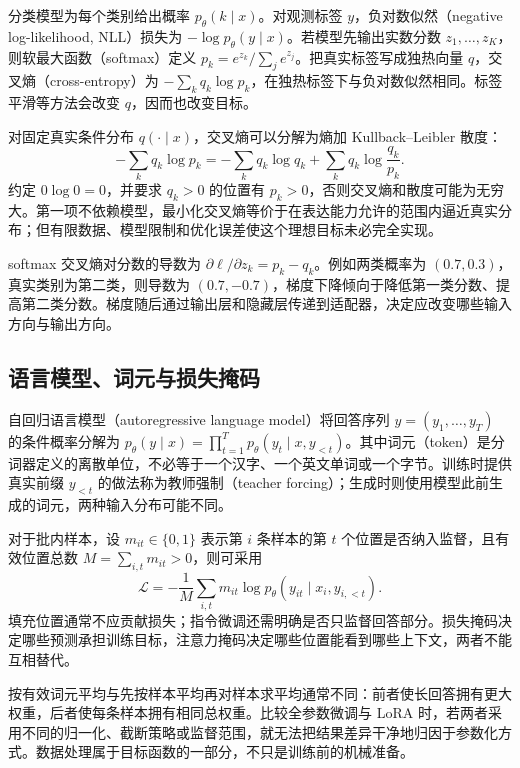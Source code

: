 \documentclass[UTF8,12pt,a4paper,fontset=fandol]{ctexart}
\begin{document}
分类模型为每个类别给出概率 $p_\theta(k\mid x)$。对观测标签 $y$，负对数似然（negative log-likelihood, NLL）损失为
$-\log p_\theta(y\mid x)$。若模型先输出实数分数 $z_1,\ldots,z_K$，则软最大函数（softmax）定义
$p_k=e^{z_k}/\sum_je^{z_j}$。把真实标签写成独热向量 $q$，交叉熵（cross-entropy）为
$-\sum_kq_k\log p_k$，在独热标签下与负对数似然相同。标签平滑等方法会改变 $q$，因而也改变目标。

对固定真实条件分布 $q(\cdot\mid x)$，交叉熵可以分解为熵加 Kullback--Leibler 散度：
\[
-\sum_kq_k\log p_k
=-\sum_kq_k\log q_k+\sum_kq_k\log\frac{q_k}{p_k}.
\]
约定 $0\log0=0$，并要求 $q_k>0$ 的位置有 $p_k>0$，否则交叉熵和散度可能为无穷大。第一项不依赖模型，最小化交叉熵等价于在表达能力允许的范围内逼近真实分布；但有限数据、模型限制和优化误差使这个理想目标未必完全实现。

softmax 交叉熵对分数的导数为 $\partial\ell/\partial z_k=p_k-q_k$。例如两类概率为 $(0.7,0.3)$，真实类别为第二类，则导数为 $(0.7,-0.7)$，梯度下降倾向于降低第一类分数、提高第二类分数。梯度随后通过输出层和隐藏层传递到适配器，决定应改变哪些输入方向与输出方向。

\subsection{语言模型、词元与损失掩码}

自回归语言模型（autoregressive language model）将回答序列 $y=(y_1,\ldots,y_T)$ 的条件概率分解为
$p_\theta(y\mid x)=\prod_{t=1}^{T}p_\theta(y_t\mid x,y_{<t})$。其中词元（token）是分词器定义的离散单位，不必等于一个汉字、一个英文单词或一个字节。训练时提供真实前缀 $y_{<t}$ 的做法称为教师强制（teacher forcing）；生成时则使用模型此前生成的词元，两种输入分布可能不同。

对于批内样本，设 $m_{it}\in\{0,1\}$ 表示第 $i$ 条样本的第 $t$ 个位置是否纳入监督，且有效位置总数 $M=\sum_{i,t}m_{it}>0$，则可采用
\begin{equation}
\mathcal L=-\frac1M\sum_{i,t}m_{it}
\log p_\theta(y_{it}\mid x_i,y_{i,<t}).
\label{eq:token-loss}
\end{equation}
填充位置通常不应贡献损失；指令微调还需明确是否只监督回答部分。损失掩码决定哪些预测承担训练目标，注意力掩码决定哪些位置能看到哪些上下文，两者不能互相替代。

按有效词元平均与先按样本平均再对样本求平均通常不同：前者使长回答拥有更大权重，后者使每条样本拥有相同总权重。比较全参数微调与 LoRA 时，若两者采用不同的归一化、截断策略或监督范围，就无法把结果差异干净地归因于参数化方式。数据处理属于目标函数的一部分，不只是训练前的机械准备。
\end{document}
